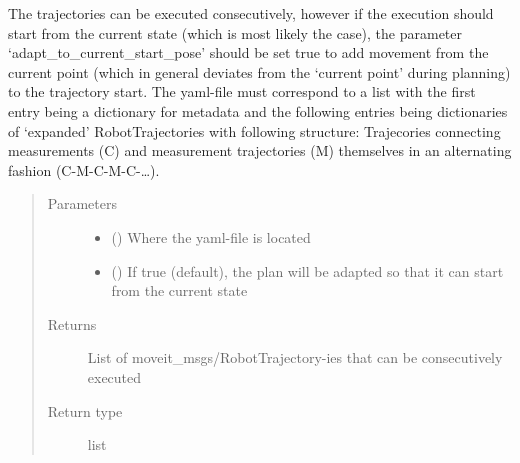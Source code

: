 \documentclass[letterpaper,10pt,english]{sphinxmanual}
\begin{document}
\begin{fulllineitems}
\begin{fulllineitems}
The trajectories can be executed consecutively, however if the execution should start from the current state (which is most
likely the case), the parameter ‘adapt\_to\_current\_start\_pose’ should be set true to add movement from the current point (which
in general deviates from the ‘current point’ during planning) to the trajectory start. The yaml-file must correspond to a list with the first
entry being a dictionary for metadata and the following entries being dictionaries of ‘expanded’ RobotTrajectories with following structure:
Trajecories connecting measurements (C) and measurement trajectories (M) themselves in an alternating fashion (C-M-C-M-C-…).
\begin{quote}\begin{description}
\item[{Parameters}] \leavevmode\begin{itemize}
\item {} 
 () \textendash{} Where the yaml-file is located

\item {} 
 () \textendash{} If true (default), the plan will be adapted so that it can start from the current state

\end{itemize}

\item[{Returns}] \leavevmode
List of moveit\_msgs/RobotTrajectory-ies that can be consecutively executed

\item[{Return type}] \leavevmode
list

\end{description}\end{quote}

\end{fulllineitems}



\end{fulllineitems}
\end{document}
